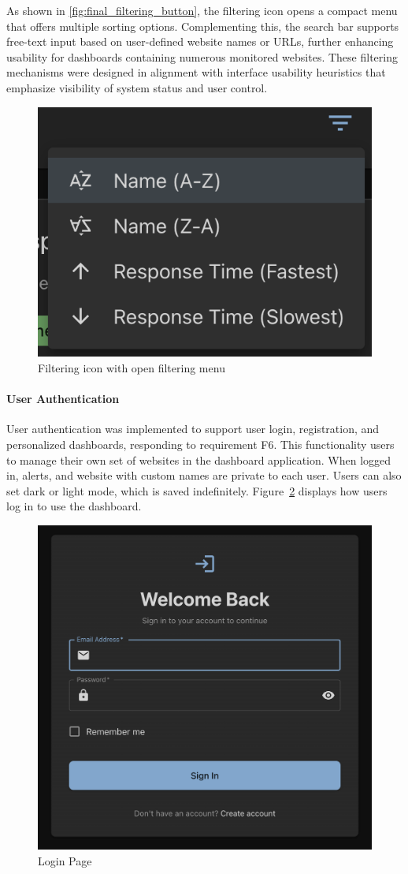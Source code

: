 As shown in \autoref{fig:final_filtering_button}, the filtering icon opens a compact menu that offers multiple sorting options. Complementing this, the search bar supports free-text input based on user-defined website names or URLs, further enhancing usability for dashboards containing numerous monitored websites. These filtering mechanisms were designed in alignment with interface usability heuristics that emphasize visibility of system status and user control.

\begin{figure}[H]
\centering
\includegraphics[width=0.5\linewidth]{figures/final_application/final-filteringbutton.png}
\caption{Filtering icon with open filtering menu}
\label{fig:final_filtering_button}
\end{figure}

\paragraph{User Authentication}
User authentication  was implemented to support user login, registration, and personalized dashboards, responding to requirement F6. This functionality users to manage their own set of websites in the dashboard application. When logged in, alerts, and website with custom names are private to each user. Users can also set dark or light mode, which is saved indefinitely. Figure~\ref{fig:login_page} displays how users log in to use the dashboard.

\begin{figure}[H]
    \centering
    \includegraphics[width=0.6\linewidth]{figures/final_application/final_loginpage.png}
    \caption{Login Page}
    \label{fig:login_page}
\end{figure}

